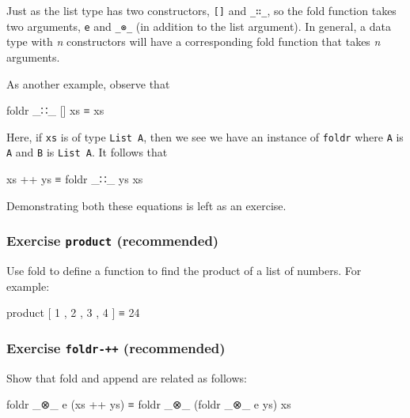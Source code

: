 Just as the list type has two constructors, \texttt{{[}{]}} and
\texttt{\_∷\_}, so the fold function takes two arguments, \texttt{e} and
\texttt{\_⊗\_} (in addition to the list argument). In general, a data
type with \emph{n} constructors will have a corresponding fold function
that takes \emph{n} arguments.

As another example, observe that

\begin{myDisplay}
foldr _∷_ [] xs ≡ xs
\end{myDisplay}

Here, if \texttt{xs} is of type \texttt{List\ A}, then we see we have an
instance of \texttt{foldr} where \texttt{A} is \texttt{A} and \texttt{B}
is \texttt{List\ A}. It follows that

\begin{myDisplay}
xs ++ ys ≡ foldr _∷_ ys xs
\end{myDisplay}

Demonstrating both these equations is left as an exercise.

\hypertarget{exercise-product-recommended}{%
\subsubsection{\texorpdfstring{Exercise \texttt{product}
(recommended)}{Exercise product (recommended)}}\label{exercise-product-recommended}}

Use fold to define a function to find the product of a list of numbers.
For example:

\begin{myDisplay}
product [ 1 , 2 , 3 , 4 ] ≡ 24
\end{myDisplay}

\begin{fence}
\begin{code}%
\>[0]\<%
\end{code}
\end{fence}

\hypertarget{exercise-foldr--recommended}{%
\subsubsection{\texorpdfstring{Exercise \texttt{foldr-++}
(recommended)}{Exercise foldr-++ (recommended)}}\label{exercise-foldr--recommended}}

Show that fold and append are related as follows:

\begin{myDisplay}
foldr _⊗_ e (xs ++ ys) ≡ foldr _⊗_ (foldr _⊗_ e ys) xs
\end{myDisplay}

